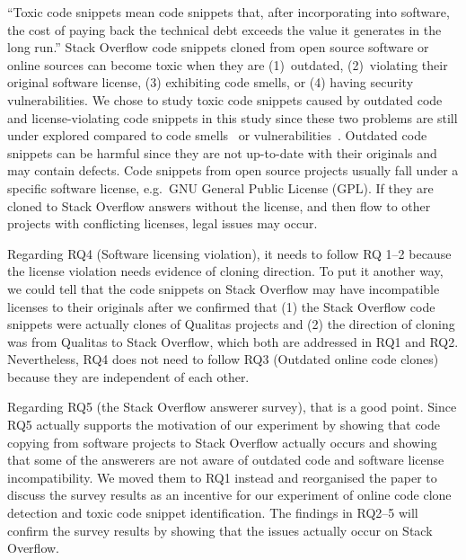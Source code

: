 \documentclass[a4paper,twoside,10pt]{reviewresponse}
\begin{document}
``Toxic code snippets mean code snippets that, after incorporating into software,
the cost of paying back the technical debt exceeds the value it generates in the long run.'' 
Stack Overflow code snippets
cloned from open source software or online sources can become toxic when they
are (1)~outdated, (2)~violating their original software
license, (3) exhibiting code smells, or (4) having security vulnerabilities. 
We chose to study toxic code snippets caused by outdated code and license-violating code snippets in
this study since these two problems are still under explored compared to code smells~\citep{Tufano2015} or vulnerabilities~\citep{Acar2016,Fischer2017}.
Outdated code snippets can be harmful since they are not up-to-date with their originals and may
contain defects. Code snippets from open source projects usually fall under a
specific software license, e.g.\ GNU General Public License (GPL). If they are
cloned to Stack Overflow answers without the license, and then flow to other projects
with conflicting licenses, legal issues may occur.
 

Regarding RQ4 (Software licensing violation), it needs to follow RQ 1--2 because the license violation needs evidence of cloning direction. To put it another way, we could tell that the code snippets on Stack Overflow may have incompatible licenses to their originals after we confirmed that (1) the Stack Overflow code snippets were actually clones of Qualitas projects and (2) the direction of cloning was from Qualitas to Stack Overflow, which both are addressed in RQ1 and RQ2.
Nevertheless, RQ4 does not need to follow RQ3 (Outdated online code clones) because they are independent of each other.

Regarding RQ5 (the Stack Overflow answerer survey), that is a good point. Since RQ5 actually supports the motivation of our experiment by showing that code copying from software projects to Stack Overflow actually occurs and showing that some of the answerers are not aware of outdated code and software license incompatibility. We moved them to RQ1 instead and reorganised the paper to discuss the survey results as an incentive for our experiment of online code clone detection and toxic code snippet identification. The findings in RQ2--5 will confirm the survey results by showing that the issues actually occur on Stack Overflow.
\end{document}
